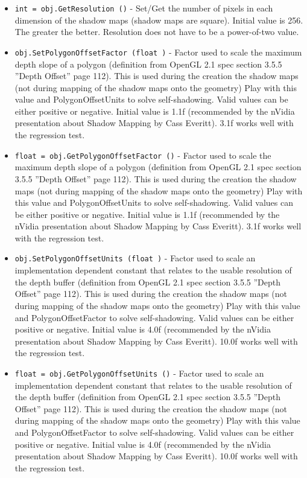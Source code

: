 \begin{itemize}
\item  \verb|int = obj.GetResolution ()| -  Set/Get the number of pixels in each dimension of the shadow maps
 (shadow maps are square). Initial value is 256. The greater the better.
 Resolution does not have to be a power-of-two value.

\item  \verb|obj.SetPolygonOffsetFactor (float )| -  Factor used to scale the maximum depth slope of a polygon (definition
 from OpenGL 2.1 spec section 3.5.5 ''Depth Offset'' page 112). This is
 used during the creation the shadow maps (not during mapping of the
 shadow maps onto the geometry)
 Play with this value and PolygonOffsetUnits to solve self-shadowing.
 Valid values can be either positive or negative.
 Initial value is 1.1f (recommended by the nVidia presentation about
 Shadow Mapping by Cass Everitt). 3.1f works well with the regression test.

\item  \verb|float = obj.GetPolygonOffsetFactor ()| -  Factor used to scale the maximum depth slope of a polygon (definition
 from OpenGL 2.1 spec section 3.5.5 ''Depth Offset'' page 112). This is
 used during the creation the shadow maps (not during mapping of the
 shadow maps onto the geometry)
 Play with this value and PolygonOffsetUnits to solve self-shadowing.
 Valid values can be either positive or negative.
 Initial value is 1.1f (recommended by the nVidia presentation about
 Shadow Mapping by Cass Everitt). 3.1f works well with the regression test.

\item  \verb|obj.SetPolygonOffsetUnits (float )| -  Factor used to scale an implementation dependent constant that relates
 to the usable resolution of the depth buffer (definition from OpenGL 2.1
 spec section 3.5.5 ''Depth Offset'' page 112). This is
 used during the creation the shadow maps (not during mapping of the
 shadow maps onto the geometry)
 Play with this value and PolygonOffsetFactor to solve self-shadowing.
 Valid values can be either positive or negative.
 Initial value is 4.0f (recommended by the nVidia presentation about
 Shadow Mapping by Cass Everitt). 10.0f works well with the regression
 test.

\item  \verb|float = obj.GetPolygonOffsetUnits ()| -  Factor used to scale an implementation dependent constant that relates
 to the usable resolution of the depth buffer (definition from OpenGL 2.1
 spec section 3.5.5 ''Depth Offset'' page 112). This is
 used during the creation the shadow maps (not during mapping of the
 shadow maps onto the geometry)
 Play with this value and PolygonOffsetFactor to solve self-shadowing.
 Valid values can be either positive or negative.
 Initial value is 4.0f (recommended by the nVidia presentation about
 Shadow Mapping by Cass Everitt). 10.0f works well with the regression
 test.

\end{itemize}
